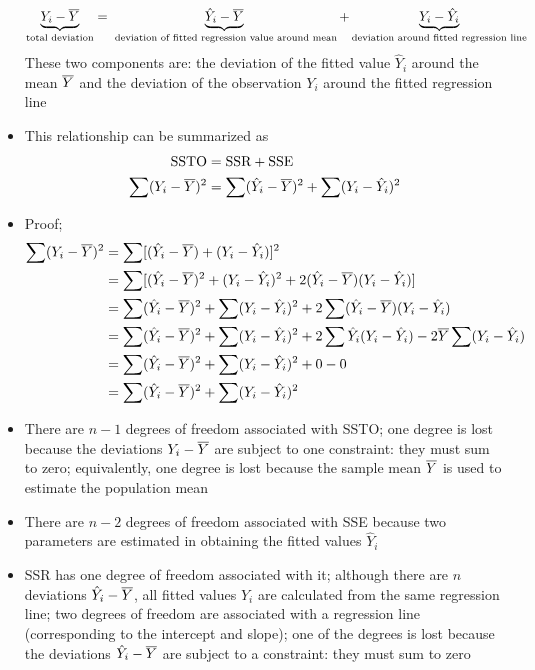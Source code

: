 \begin{itemize}
$$ \underbrace{Y_i - \overline{Y}}_{\text{total deviation}} = \underbrace{\hat{Y}_i - \overline{Y}}_{\text{ deviation of fitted regression value around mean}} + \underbrace{Y_i - \hat{Y}_i}_{\text{deviation around fitted regression line}} $$ These two components are: the deviation of the fitted value $\hat{Y}_i$ around the mean $\overline{Y}$ and the deviation of the observation $Y_i$ around the fitted regression line
\item This relationship can be summarized as $$ \begin{aligned} \text{SSTO} &= \text{SSR} + \text{SSE} \\ \sum (Y_i - \overline{Y})^2 &= \sum (\hat{Y}_i - \overline{Y})^2 + \sum (Y_i - \hat{Y}_i)^2 \end{aligned} $$ 
\item Proof; $$ \begin{aligned} \sum (Y_i - \overline{Y})^2 &= \sum[(\hat{Y}_i - \overline{Y}) + (Y_i - \hat{Y}_i)]^2 \\ &= \sum [(\hat{Y}_i - \overline{Y})^2 + (Y_i - \hat{Y}_i)^2 + 2(\hat{Y}_i - \overline{Y})(Y_i - \hat{Y}_i)] \\ &= \sum (\hat{Y}_i - \overline{Y})^2 + \sum (Y_i - \hat{Y}_i)^2 + 2\sum (\hat{Y}_i - \overline{Y})(Y_i - \hat{Y}_i) \\ &= \sum (\hat{Y}_i - \overline{Y})^2 + \sum (Y_i - \hat{Y}_i)^2 + 2\sum \hat{Y}_i(Y_i - \hat{Y}_i) - 2\overline{Y} \sum (Y_i - \hat{Y}_i) \\ &= \sum (\hat{Y}_i - \overline{Y})^2 + \sum (Y_i - \hat{Y}_i)^2 + 0 - 0 \\ &= \sum (\hat{Y}_i - \overline{Y})^2 + \sum (Y_i - \hat{Y}_i)^2 \end{aligned} $$ 
\item There are $n-1$ degrees of freedom associated with SSTO; one degree is lost because the deviations $Y_i - \overline{Y}$ are subject to one constraint: they must sum to zero; equivalently, one degree is lost because the sample mean $\overline{Y}$ is used to estimate the population mean
\item There are $n-2$ degrees of freedom associated with SSE because two parameters are estimated in obtaining the fitted values $\hat{Y}_i$
\item SSR has one degree of freedom associated with it; although there are $n$ deviations $\hat{Y}_i - \overline{Y}$, all fitted values $\hat{Y}_i$ are calculated from the same regression line; two degrees of freedom are associated with a regression line (corresponding to the intercept and slope); one of the degrees is lost because the deviations $\hat{Y}_i - \overline{Y}$ are subject to a constraint: they must sum to zero

\end{itemize}
